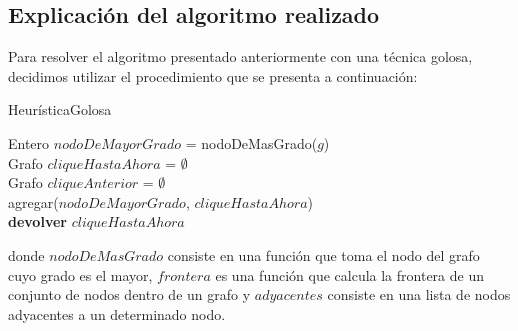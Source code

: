 \subsection{Explicación del algoritmo realizado}
Para resolver el algoritmo presentado anteriormente con una técnica golosa, decidimos utilizar el procedimiento que se presenta a continuación:\newline
\newline
\begin{algorithm}[H]
    \SetAlgoLined
    \caption{HeurísticaGolosa}
	Entero $nodoDeMayorGrado$ = nodoDeMasGrado($g$)\\
	Grafo $cliqueHastaAhora$ = $\emptyset$\\
	Grafo $cliqueAnterior$ = $\emptyset$\\
	agregar($nodoDeMayorGrado$, $cliqueHastaAhora$)\\
\textbf{devolver} $cliqueHastaAhora$
\end{algorithm}

donde $nodoDeMasGrado$ consiste en una función que toma el nodo del grafo cuyo grado es el mayor, $frontera$ es una función que calcula la frontera de un conjunto de nodos dentro de un grafo y $adyacentes$ consiste en una lista de nodos adyacentes a un determinado nodo.\newline

